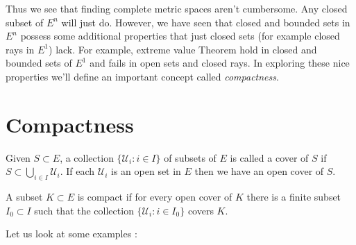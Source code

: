 Thus we see that finding complete metric spaces aren't cumbersome. Any closed subset of $E^n$ will
just do. However, we have seen that closed and bounded sets in $E^n$ possess some additional 
properties that just closed sets (for example closed rays in $E^1$) lack. For example, 
extreme value Theorem hold in closed and bounded sets of $E^1$ and fails in open sets and closed
rays. In exploring these nice properties we'll define an important concept called
\emph{compactness}.
\section{Compactness}
\begin{Definition}
    Given $S \subset E$, a collection $\left.\lbrace \mathcal{U}_i : i \in I \rbrace\right.$ of
    subsets of $E$ is called a cover of $S$ if $S \subset \bigcup_{i \in I} \mathcal{U}_i$. If each
    $\mathcal{U}_i$ is an open set in $E$ then we have an open cover of $S$.
\end{Definition}
\begin{Definition}
    A subset $K \subset E$ is compact if for every open cover of $K$ there is a finite subset $I_0
    \subset I$ such that the collection $\left.\lbrace \mathcal{U}_i : i \in I_0 \rbrace\right.$
    covers $K$.
\end{Definition}
Let us look at some examples :
